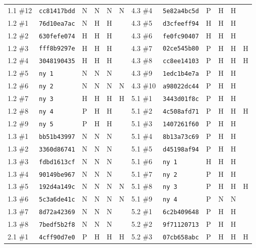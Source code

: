 {\begin{longtable}{@{}llcccc@{\hspace{2em}}llcccc@{}}
    1.1 \#12 & \texttt{cc81417bdd} & N & N & N & N &
     4.3 \#4 & \texttt{5e82a4bc5d} & P & H & H &  \\
    1.2 \#1 & \texttt{76d10ea7ac} & N & H & H & &
     4.3 \#5 & \texttt{d3cfeeff94} & H & H & H &  \\
    1.2 \#2 & \texttt{630fefe074} & H & H & H & &
     4.3 \#6 & \texttt{fe0fc90407} & H & H & H &  \\
    1.2 \#3 & \texttt{fff8b9297e} & H & H & H & &
     4.3 \#7 & \texttt{02ce545b80} & P & H & H & H \\
    1.2 \#4 & \texttt{3048190435} & H & H & H & &
     4.3 \#8 & \texttt{cc8ee14103} & P & H & H & H \\
    1.2 \#5 & \texttt{ny 1} & N & N & N & &
     4.3 \#9 & \texttt{1edc1b4e7a} & P & H & H &  \\
    1.2 \#6 & \texttt{ny 2} & N & N & N & N &
     4.3 \#10 & \texttt{a98022dc44} & P & H & H &  \\
    1.2 \#7 & \texttt{ny 3} & H & H & H & H &
     5.1 \#1 & \texttt{3443d01f8c} & P & H & H &  \\
    1.2 \#8 & \texttt{ny 4} & P & H & H & &
     5.1 \#2 & \texttt{4c508afd71} & P & H & H & H \\
    1.2 \#9 & \texttt{ny 5} & P & H & H & &
     5.1 \#3 & \texttt{1407261f60} & P & H & H &  \\
    1.3 \#1 & \texttt{bb51b43997} & N & N & N & &
     5.1 \#4 & \texttt{8b13a73c69} & P & H & H &  \\
    1.3 \#2 & \texttt{3360d86741} & N & N & N & &
     5.1 \#5 & \texttt{d45198af94} & P & H & H &  \\
    1.3 \#3 & \texttt{fdbd1613cf} & N & N & N & &
     5.1 \#6 & \texttt{ny 1} & H & H & H &  \\
    1.3 \#4 & \texttt{90149be967} & N & N & N & &
     5.1 \#7 & \texttt{ny 2} & P & H & H &  \\
    1.3 \#5 & \texttt{192d4a149c} & N & N & N & N &
     5.1 \#8 & \texttt{ny 3} & P & H & H & H \\
    1.3 \#6 & \texttt{5c3a6de41c} & N & N & N & N &
     5.1 \#9 & \texttt{ny 4} & P & N & N &  \\
    1.3 \#7 & \texttt{8d72a42369} & N & N & N & &
     5.2 \#1 & \texttt{6c2b409648} & P & H & H &  \\
    1.3 \#8 & \texttt{7bedf5b2f8} & N & N & N & &
     5.2 \#2 & \texttt{9f71120713} & P & H & H &  \\
    2.1 \#1 & \texttt{4cff90d7e0} & P & H & H & H &
     5.2 \#3 & \texttt{07cb658abc} & P & H & H & H \\

\end{longtable}}
